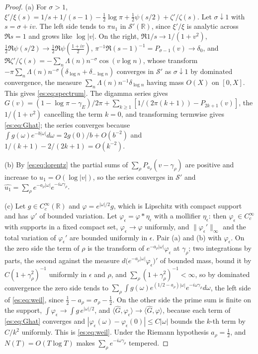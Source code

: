 \begin{proof}
(a) For $\sigma>1$, $\xi'/\xi(s)=1/s+1/(s-1)-\tfrac12\log\pi+\tfrac12\psi(s/2)+\zeta'/\zeta(s)$. Let $\sigma\downarrow1$ with $s=\sigma+iv$. The left side tends to $\pi u_1$ in $\mathcal S'(\mathbb R)$, since $\xi'/\xi$ is analytic across $\Re s=1$ and grows like $\log|v|$. On the right, $\Re1/s\to1/(1+v^2)$, $\tfrac12\Re\psi(s/2)\to\tfrac12\Re\psi(\tfrac{1+iv}2)$, $\pi^{-1}\Re(s-1)^{-1}=P_{\sigma-1}(v)\to\delta_0$, and $\Re\zeta'/\zeta(s)=-\sum_n\Lambda(n)n^{-\sigma}\cos(v\log n)$, whose transform $-\pi\sum_n\Lambda(n)n^{-\sigma}(\delta_{\log n}+\delta_{-\log n})$ converges in $\mathcal S'$ as $\sigma\downarrow1$ by dominated convergence, the measure $\sum_n\Lambda(n)n^{-1}\delta_{\log n}$ having mass $O(X)$ on $[0,X]$. This gives \eqref{es:eq:spectrum}. The digamma series gives $G(v)=(1-\log\pi-\gamma_E)/2\pi+\sum_{k\ge1}[1/(2\pi(k+1))-P_{2k+1}(v)]$, the $1/(1+v^2)$ cancelling the term $k=0$, and transforming termwise gives \eqref{es:eq:Ghat}; the series converges because $\int g(\omega)e^{-b|\omega|}d\omega=2g(0)/b+O(b^{-2})$ and $1/(k+1)-2/(2k+1)=O(k^{-2})$.

(b) By \eqref{es:eq:lorentz} the partial sums of $\sum_\rho P_{a_\rho}(v-\gamma_\rho)$ are positive and increase to $u_1=O(\log|v|)$, so the series converges in $\mathcal S'$ and $\widehat{u_1}=\sum_\rho e^{-a_\rho|\omega|}e^{-i\omega\gamma_\rho}$.

(c) Let $g\in C_c^\infty(\mathbb R)$ and $\varphi=e^{|\omega|/2}g$, which is Lipschitz with compact support and has $\varphi'$ of bounded variation. Let $\varphi_\epsilon=\varphi*\eta_\epsilon$ with a mollifier $\eta_\epsilon$: then $\varphi_\epsilon\in C_c^\infty$ with supports in a fixed compact set, $\varphi_\epsilon\to\varphi$ uniformly, and $\|\varphi_\epsilon'\|_\infty$ and the total variation of $\varphi_\epsilon'$ are bounded uniformly in $\epsilon$. Pair (a) and (b) with $\varphi_\epsilon$. On the zero side the term of $\rho$ is the transform of $e^{-a_\rho|\omega|}\varphi_\epsilon$ at $\gamma_\rho$; two integrations by parts, the second against the measure $d\bigl(e^{-a_\rho|\omega|}\varphi_\epsilon\bigr)'$ of bounded mass, bound it by $C(1+\gamma_\rho^2)^{-1}$ uniformly in $\epsilon$ and $\rho$, and $\sum_\rho(1+\gamma_\rho^2)^{-1}<\infty$, so by dominated convergence the zero side tends to $\sum_\rho\int g(\omega)e^{(1/2-a_\rho)|\omega|}e^{-i\omega\gamma_\rho}d\omega$, the left side of \eqref{es:eq:weil}, since $\tfrac12-a_\rho=\sigma_\rho-\tfrac12$. On the other side the prime sum is finite on the support, $\int\varphi_\epsilon\to\int g\,e^{|\omega|/2}$, and $\langle\widehat G,\varphi_\epsilon\rangle\to\langle\widehat G,\varphi\rangle$, because each term of \eqref{es:eq:Ghat} converges and $|\varphi_\epsilon(\omega)-\varphi_\epsilon(0)|\le C|\omega|$ bounds the $k$-th term by $C/k^2$ uniformly. This is \eqref{es:eq:weil}. Under the Riemann hypothesis $a_\rho=\tfrac12$, and $N(T)=O(T\log T)$ makes $\sum_\rho e^{-i\omega\gamma_\rho}$ tempered.
\end{proof}

